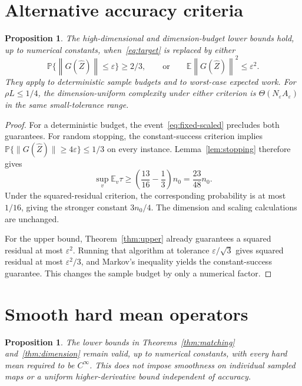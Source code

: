 \documentclass[11pt,a4paper]{article}
\newcommand{\E}{\mathbb E}
\newcommand{\Pp}{\mathbb P}
\newcommand{\eps}{\varepsilon}
\newcommand{\norm}[1]{\left\lVert #1\right\rVert}
\newtheorem{proposition}[theorem]{Proposition}
\theoremstyle{definition}
\theoremstyle{remark}
\begin{document}
\section{Alternative accuracy criteria}\label{app:criteria}
\begin{proposition}\label{prop:criteria}
The high-dimensional and dimension-budget lower bounds hold, up to numerical
constants, when~\eqref{eq:target} is replaced by either
\begin{equation}\label{eq:other-criteria}
 \Pp\{\norm{G(\widehat Z)}\le\eps\}\ge2/3,
 \qquad\text{or}\qquad
 \E\norm{G(\widehat Z)}^2\le\eps^2.
\end{equation}
They apply to deterministic sample budgets and to worst-case expected work.
For $\rho L\le1/4$, the dimension-uniform complexity under either criterion
is $\Theta(N_\eps A_\eps)$ in the same small-tolerance range.
\end{proposition}
\begin{proof}
For a deterministic budget, the event~\eqref{eq:fixed-scaled} precludes both
guarantees. For random stopping, the constant-success criterion implies
$\Pp\{\|G(\widehat Z)\|\ge4\eps\}\le1/3$ on every instance.
Lemma~\ref{lem:stopping} therefore gives
\[
 \sup_v\E_v\tau\ge
 \left(\frac{13}{16}-\frac13\right)n_0=\frac{23}{48}n_0.
\]
Under the squared-residual criterion, the corresponding probability is
at most $1/16$, giving the stronger constant $3n_0/4$.
The dimension and scaling calculations are unchanged.

For the upper bound, Theorem~\ref{thm:upper} already guarantees a squared
residual at most $\eps^2$. Running that algorithm at tolerance
$\eps/\sqrt3$ gives squared residual at most $\eps^2/3$, and Markov's
inequality yields the constant-success guarantee. This changes the sample
budget by only a numerical factor.
\end{proof}

\section{Smooth hard mean operators}\label{app:smooth}
\begin{proposition}\label{prop:smooth}
The lower bounds in Theorems~\ref{thm:matching} and~\ref{thm:dimension} remain valid, up to numerical constants, with every hard mean required to be $C^\infty$. This does not impose smoothness on individual sampled maps or a uniform higher-derivative bound independent of accuracy.
\end{proposition}
\end{document}
